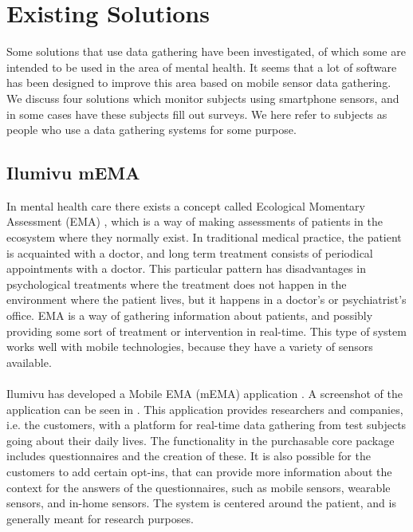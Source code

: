 
\section{Existing Solutions}
\label{sec:existing_solutions}

Some solutions that use data gathering have been investigated, of which some are intended to be used in the area of mental health. It seems that a lot of software has been designed to improve this area based on mobile sensor data gathering. We discuss four solutions which monitor subjects using smartphone sensors, and in some cases have these subjects fill out surveys. We here refer to subjects as people who use a data gathering systems for some purpose.

\subsection{Ilumivu mEMA}
\label{sub:ilumivu_mema}
In mental health care there exists a concept called Ecological Momentary Assessment (EMA) \parencite{shiffman2008ecological}, which is a way of making assessments of patients in the ecosystem where they normally exist. In traditional medical practice, the patient is acquainted with a doctor, and long term treatment consists of periodical appointments with a doctor. This particular pattern has disadvantages in psychological treatments where the treatment does not happen in the environment where the patient lives, but it happens in a doctor's or psychiatrist's office. EMA is a way of gathering information about patients, and possibly providing some sort of treatment or intervention in real-time. This type of system works well with mobile technologies, because they have a variety of sensors available.
\\\\
Ilumivu has developed a Mobile EMA (mEMA) application \parencite{lumivu}. A screenshot of the application can be seen in . This application provides researchers and companies, i.e. the customers, with a platform for real-time data gathering from test subjects going about their daily lives. The functionality in the purchasable core package includes questionnaires and the creation of these. It is also possible for the customers to add certain opt-ins, that can provide more information about the context for the answers of the questionnaires, such as mobile sensors, wearable sensors, and in-home sensors. The system is centered around the patient, and is generally meant for research purposes.


